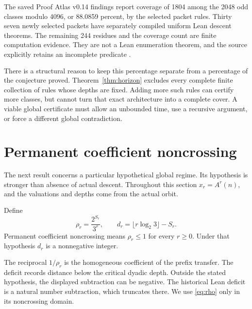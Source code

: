 The saved Proof Atlas v0.14 findings report coverage of 1804 among the 2048 odd classes modulo 4096, or 88.0859 percent, by the selected packet rules. Thirty seven newly selected packets have separately compiled uniform Lean descent theorems. The remaining 244 residues and the coverage count are finite computation evidence. They are not a Lean enumeration theorem, and the source explicitly retains an incomplete predicate \cite{projectcollatzresidues}.


There is a structural reason to keep this percentage separate from a percentage of the conjecture proved. Theorem~\ref{thm:horizon} excludes every complete finite collection of rules whose depths are fixed. Adding more such rules can certify more classes, but cannot turn that exact architecture into a complete cover. A viable global certificate must allow an unbounded time, use a recursive argument, or force a different global contradiction.

\section{Permanent coefficient noncrossing}
The next result concerns a particular hypothetical global regime. Its hypothesis is stronger than absence of actual descent. Throughout this section $x_r=A^r(n)$, and the valuations and depths come from the actual orbit.

\begin{definition}\label{def:noncross}
Define
\begin{equation}\label{eq:rho}
\rho_r=\frac{2^{S_r}}{3^r},\qquad
d_r=\lfloor r\log_2 3\rfloor-S_r.
\end{equation}
Permanent coefficient noncrossing means $\rho_r\le1$ for every $r\ge0$. Under that hypothesis $d_r$ is a nonnegative integer.
\end{definition}

The reciprocal $1/\rho_r$ is the homogeneous coefficient of the prefix transfer. The deficit records distance below the critical dyadic depth. Outside the stated hypothesis, the displayed subtraction can be negative. The historical Lean deficit is a natural number subtraction, which truncates there. We use \eqref{eq:rho} only in its noncrossing domain.

